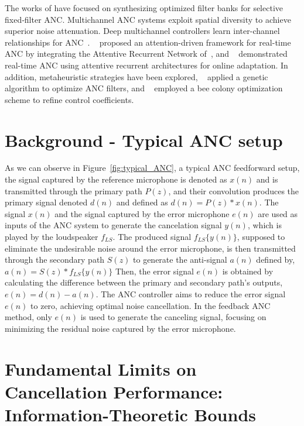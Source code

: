 \documentclass{article}
\begin{document}
The works of \cite{luo2023deep, luo2023delayless, luo2024unsupervised} have focused on synthesizing optimized filter banks for selective fixed‐filter ANC. Multichannel ANC systems exploit spatial diversity to achieve superior noise attenuation. Deep multichannel controllers learn inter-channel relationships for ANC~\cite{zhu2021new, zhang2023deep, antonanzas2023remote, xiao2023spatially, zhang2023time, shi2023multichannel, shi2024behind}. ~\cite{zhang2023low} proposed an attention-driven framework for real-time ANC by integrating the Attentive Recurrent Network of~\cite{pandey2022self}, and ~\cite{zhang2022attentive} demonstrated real-time ANC using attentive recurrent architectures for online adaptation. In addition, metaheuristic strategies have been explored, ~\cite{zhou2023genetic} applied a genetic algorithm to optimize ANC filters, and ~\cite{ren2022improved} employed a bee colony optimization scheme to refine control coefficients.  



\section{Background - Typical ANC setup}

As we can observe in Figure~\ref{fig:typical_ANC}, a typical ANC feedforward setup, the signal captured by the reference microphone is denoted as $x(n)$ and is transmitted through the primary path $P(z)$, and their convolution produces the primary signal denoted $d(n)$ and defined as $d(n) = P(z)*x(n)$. The signal $x(n)$ and the signal captured by the error microphone $e(n)$ are used as inputs of the ANC system to generate the cancelation signal $y(n)$, which is played by the loudspeaker $f_{LS}$. The produced signal $f_{LS}\{y(n)\}$, supposed to eliminate the undesirable noise around the error microphone, is then transmitted through the secondary path $S(z)$ to generate the anti-signal $a(n)$ defined by, $a(n) = S(z)*f_{LS}\{y(n)\}$
Then, the error signal $e(n)$ is obtained by calculating the difference between the primary and secondary path's outputs, $e(n) = d(n) - a(n)$. The ANC controller aims to reduce the error signal $e(n)$ to zero, achieving optimal noise cancellation. In the feedback ANC method, only $e(n)$ is used to generate the canceling signal, focusing on minimizing the residual noise captured by the error microphone.

\section{Fundamental Limits on Cancellation Performance: Information-Theoretic Bounds}
\end{document}
